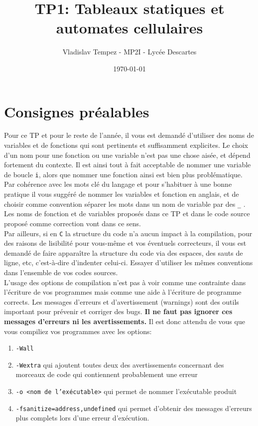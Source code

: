 \documentclass[11pt]{article}
\author{Vladislav Tempez - MP2I - Lycée Descartes}
\date{\today}
\title{TP1: Tableaux statiques et automates cellulaires}
\begin{document}
\maketitle

\section{Consignes préalables}
\label{sec:org5677c8f}
Pour ce TP et pour le reste de l'année, il vous est demandé d'utiliser des noms de variables et de fonctions qui sont pertinents et suffisamment explicites. Le choix d'un nom pour une fonction ou une variable n'est pas une chose aisée, et dépend fortement du contexte.
Il est ainsi tout à fait acceptable de nommer une variable de boucle \texttt{i}, alors que nommer une fonction ainsi est bien plus problématique.
Par cohérence avec les mots clé du langage et pour s'habituer à une bonne pratique il vous suggéré de nommer les variables et fonction en anglais, et de choisir comme convention séparer les mots dans un nom de variable par des \texttt{\_} .
Les noms de fonction et de variables proposés dans ce TP et dans le code source proposé comme correction vont dans ce sens.\\

Par ailleurs, si en \texttt{C} la structure du code n'a aucun impact à la compilation, pour des raisons de lisibilité pour vous-même et vos éventuels correcteurs, il vous est demandé de faire apparaître la structure du code via des espaces, des sauts de ligne, etc, c'est-à-dire d'indenter celui-ci. Essayer d'utiliser les mêmes conventions dans l'ensemble de vos codes sources.\\

L'usage des options de compilation n'est pas à voir comme une contrainte dans l'écriture de vos programmes mais comme une aide à l'écriture de programme corrects. Les messages d'erreurs et d'avertissement (warnings) sont des outils important pour prévenir et corriger des bugs. \textbf{Il ne faut pas ignorer ces messages d'erreurs ni les avertissements.}
Il est donc attendu de vous que vous compiliez vos programmes avec les options:
\begin{enumerate}
\item \texttt{-Wall}
\item \texttt{-Wextra} qui ajoutent toutes deux des avertissements concernant des morceaux de code qui contiennent probablement une erreur
\item \texttt{-o <nom de l’exécutable>} qui permet de nommer l'exécutable produit
\item \texttt{-fsanitize=address,undefined} qui permet d'obtenir des messages d'erreurs plus complets lors d'une erreur d'exécution.
\end{enumerate}
\end{document}
